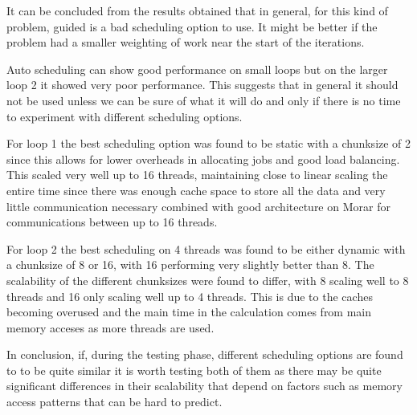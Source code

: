 \documentclass[12pt]{article}    %
\numberwithin{equation}{section}
\begin{document}
It can be concluded from the results obtained that in general, for this kind of problem, guided is a bad scheduling option to use.
It might be better if the problem had a smaller weighting of work near the start of the iterations.

Auto scheduling can show good performance on small loops but on the larger loop 2 it showed very poor performance.
This suggests that in general it should not be used unless we can be sure of what it will do and only if there is no time to experiment with different scheduling options.

For loop 1 the best scheduling option was found to be static with a chunksize of 2 since this allows for lower overheads in allocating jobs and good load balancing.
This scaled very well up to 16 threads, maintaining close to linear scaling the entire time since there was enough cache space to store all the data and very little communication necessary combined with good architecture on Morar for communications between up to 16 threads.

For loop 2 the best scheduling on 4 threads was found to be either dynamic with a chunksize of 8 or 16, with 16 performing very slightly better than 8.
The scalability of the different chunksizes were found to differ, with 8 scaling well to 8 threads and 16 only scaling well up to 4 threads.
This is due to the caches becoming overused and the main time in the calculation comes from main memory acceses as more threads are used.

In conclusion, if, during the testing phase, different scheduling options are found to to be quite similar it is worth testing both of them as there may be quite significant differences in their scalability that depend on factors such as memory access patterns that can be hard to predict.
\end{document}
